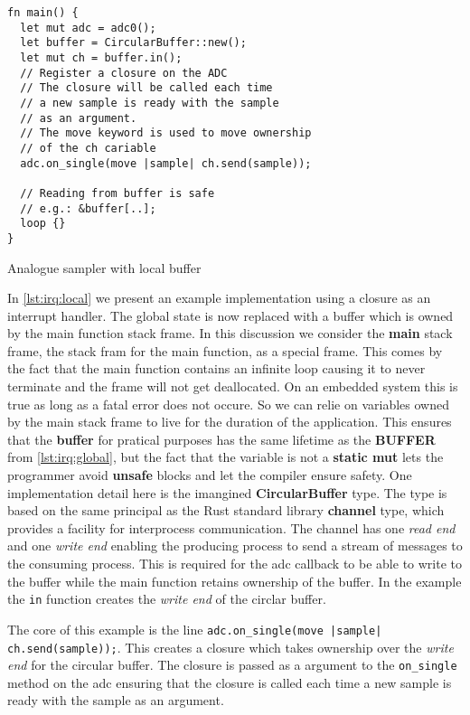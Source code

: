 \begin{listing}[H]
  \begin{verbatim}
fn main() {
  let mut adc = adc0();
  let buffer = CircularBuffer::new();
  let mut ch = buffer.in();
  // Register a closure on the ADC
  // The closure will be called each time
  // a new sample is ready with the sample
  // as an argument.
  // The move keyword is used to move ownership
  // of the ch cariable
  adc.on_single(move |sample| ch.send(sample));

  // Reading from buffer is safe
  // e.g.: &buffer[..];
  loop {}
}
  \end{verbatim}
  \caption{Analogue sampler with local buffer}
  \label{lst:irq:local}
\end{listing}

In \autoref{lst:irq:local} we present an example implementation using a closure as an interrupt handler.
The global state is now replaced with a buffer which is owned by the main function stack frame.
In this discussion we consider the \textbf{main} stack frame, the stack fram for the main function, as a special frame.
This comes by the fact that the main function contains an infinite loop causing it to never terminate and the frame will not get deallocated.
On an embedded system this is true as long as a fatal error does not occure.
So we can relie on variables owned by the main stack frame to live for the duration of the application.
This ensures that the \textbf{buffer} for pratical purposes has the same lifetime as the \textbf{BUFFER} from \autoref{lst:irq:global}, but the fact that the variable is not a \textbf{static mut} lets the programmer avoid \textbf{unsafe} blocks and let the compiler ensure safety.
One implementation detail here is the imangined \textbf{CircularBuffer} type.
The type is based on the same principal as the Rust standard library \textbf{channel} type, which provides a facility for interprocess communication.
The channel has one \textit{read end} and one \textit{write end} enabling the producing process to send a stream of messages to the consuming process.
This is required for the \gls{adc} callback to be able to write to the buffer while the main function retains ownership of the buffer.
In the example the \texttt{in} function creates the \textit{write end} of the circlar buffer.

The core of this example is the line \texttt{adc.on\_single(move |sample| ch.send(sample));}.
This creates a closure which takes ownership over the \textit{write end} for the circular buffer.
The closure is passed as a argument to the \texttt{on\_single} method on the \gls{adc} ensuring that the closure is called each time a new sample is ready with the sample as an argument.

